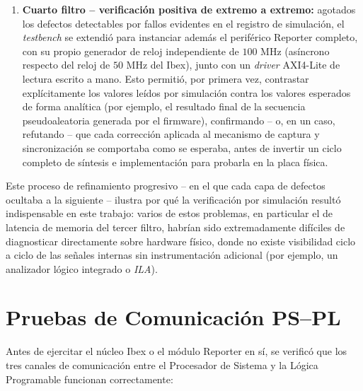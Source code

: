\begin{enumerate}
    \item \textbf{Cuarto filtro -- verificación positiva de extremo a
    extremo:} agotados los defectos detectables por fallos evidentes en el
    registro de simulación, el \textit{testbench} se extendió para
    instanciar además el periférico Reporter completo, con su propio
    generador de reloj independiente de $100\text{ MHz}$ (asíncrono
    respecto del reloj de $50\text{ MHz}$ del Ibex), junto con un
    \textit{driver} AXI4-Lite de lectura escrito a mano. Esto permitió,
    por primera vez, contrastar explícitamente los valores leídos por
    simulación contra los valores esperados de forma analítica (por
    ejemplo, el resultado final de la secuencia pseudoaleatoria generada
    por el firmware), confirmando -- o, en un caso, refutando -- que cada
    corrección aplicada al mecanismo de captura y sincronización se
    comportaba como se esperaba, antes de invertir un ciclo completo de
    síntesis e implementación para probarla en la placa física.
\end{enumerate}

Este proceso de refinamiento progresivo -- en el que cada capa de defectos
ocultaba a la siguiente -- ilustra por qué la verificación por simulación
resultó indispensable en este trabajo: varios de estos problemas, en
particular el de latencia de memoria del tercer filtro, habrían sido
extremadamente difíciles de diagnosticar directamente sobre hardware
físico, donde no existe visibilidad ciclo a ciclo de las señales internas
sin instrumentación adicional (por ejemplo, un analizador lógico integrado
o \textit{ILA}).


\section{Pruebas de Comunicación PS--PL}
\label{sec:pruebas_ps_pl}

Antes de ejercitar el núcleo Ibex o el módulo Reporter en sí, se verificó
que los tres canales de comunicación entre el Procesador de Sistema y la
Lógica Programable funcionan correctamente:

